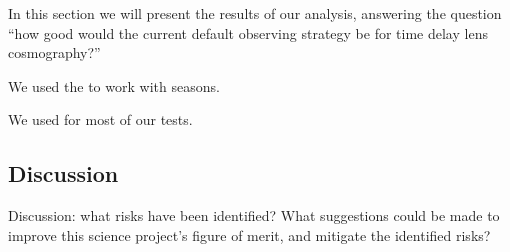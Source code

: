 
In this section we will present the results of our \OpSim analysis,
answering the question ``how good would the current default observing
strategy be for time delay lens cosmography?''

We used the  to work with seasons.

We used  for most of our tests.



\subsection{Discussion}
\label{sec:\secname:discussion}

Discussion: what risks have been identified? What suggestions could be
made to improve this science project's figure of merit, and mitigate
the identified risks?


\navigationbar


